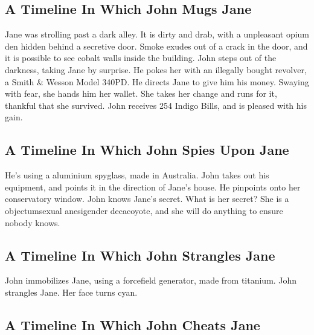 \documentclass{article}
\begin{document}
\subsection{A Timeline In Which John Mugs Jane}


Jane was strolling past a dark alley.
It is dirty and drab, with a unpleasant opium den hidden behind a secretive door.
Smoke exudes out of a crack in the door, and it is possible to see cobalt walls inside the building.
John steps out of the darkness, taking Jane by surprise.
He pokes her with an illegally bought revolver, a Smith \& Wesson Model 340PD.
He directs Jane to give him his money.
Swaying with fear, she hands him her wallet.
She takes her change and runs for it, thankful that she survived.
John receives 254 Indigo Bills, and is pleased with his gain.
\subsection{A Timeline In Which John Spies Upon Jane}


He's using a aluminium spyglass, made in Australia.
John takes out his equipment, and points it in the direction of Jane's house. He pinpoints onto her conservatory window.
John knows Jane's secret. What is her secret? She is a objectumsexual anesigender decacoyote, and she will do anything to ensure nobody knows.
\subsection{A Timeline In Which John Strangles Jane}


John immobilizes Jane, using a forcefield generator, made from titanium.
John strangles Jane.
Her face turns cyan.
\subsection{A Timeline In Which John Cheats Jane}
\end{document}
